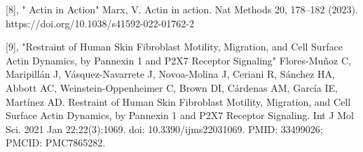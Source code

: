 \documentclass[a4paper,english,12pt,bibliography=totoc]{scrreprt}
\begin{document}
[8], " Actin in Action" Marx, V. Actin in action. Nat Methods 20, 178–182 (2023). https://doi.org/10.1038/s41592-022-01762-2

[9], "Restraint of Human Skin Fibroblast Motility, Migration, and Cell Surface Actin Dynamics, by Pannexin 1 and P2X7 Receptor Signaling" Flores-Muñoz C, Maripillán J, Vásquez-Navarrete J, Novoa-Molina J, Ceriani R, Sánchez HA, Abbott AC, Weinstein-Oppenheimer C, Brown DI, Cárdenas AM, García IE, Martínez AD. Restraint of Human Skin Fibroblast Motility, Migration, and Cell Surface Actin Dynamics, by Pannexin 1 and P2X7 Receptor Signaling. Int J Mol Sci. 2021 Jan 22;22(3):1069. doi: 10.3390/ijms22031069. PMID: 33499026; PMCID: PMC7865282.
\end{document}
